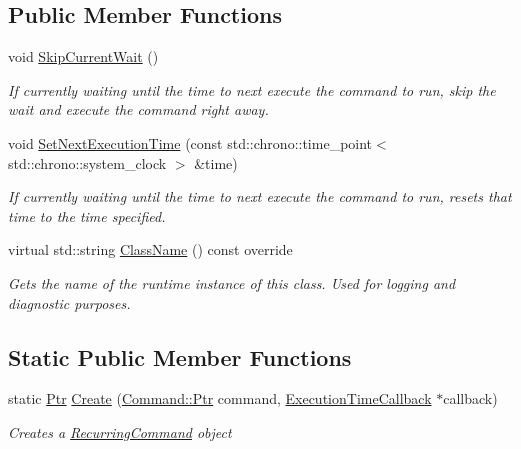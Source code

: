 \subsection*{Public Member Functions}
\begin{DoxyCompactItemize}
\item 
void \mbox{\hyperlink{class_command_lib_1_1_recurring_command_a11e19f7c0cbc93c33e36f6c75d858b0f}{Skip\+Current\+Wait}} ()
\begin{DoxyCompactList}\small\item\em If currently waiting until the time to next execute the command to run, skip the wait and execute the command right away.\end{DoxyCompactList}\item 
void \mbox{\hyperlink{class_command_lib_1_1_recurring_command_a954ee8723b21944ab9aa01df0740b690}{Set\+Next\+Execution\+Time}} (const std\+::chrono\+::time\+\_\+point$<$ std\+::chrono\+::system\+\_\+clock $>$ \&time)
\begin{DoxyCompactList}\small\item\em If currently waiting until the time to next execute the command to run, resets that time to the time specified. \end{DoxyCompactList}\item 
\mbox{\label{class_command_lib_1_1_recurring_command_a4e2073b92185dd5f7b545d774afbb929}} 
virtual std\+::string \mbox{\hyperlink{class_command_lib_1_1_recurring_command_a4e2073b92185dd5f7b545d774afbb929}{Class\+Name}} () const override
\begin{DoxyCompactList}\small\item\em Gets the name of the runtime instance of this class. Used for logging and diagnostic purposes.  \end{DoxyCompactList}\end{DoxyCompactItemize}
\subsection*{Static Public Member Functions}
\begin{DoxyCompactItemize}
\item 
static \mbox{\hyperlink{class_command_lib_1_1_command_a3b3e4f00144373299df5c6bb1acc319d}{Ptr}} \mbox{\hyperlink{class_command_lib_1_1_recurring_command_afac0e064cbce4cea8fe5d734367b7c3a}{Create}} (\mbox{\hyperlink{class_command_lib_1_1_command_a3b3e4f00144373299df5c6bb1acc319d}{Command\+::\+Ptr}} command, \mbox{\hyperlink{class_command_lib_1_1_recurring_command_1_1_execution_time_callback}{Execution\+Time\+Callback}} $\ast$callback)
\begin{DoxyCompactList}\small\item\em Creates a \mbox{\hyperlink{class_command_lib_1_1_recurring_command}{Recurring\+Command}} object \end{DoxyCompactList}\end{DoxyCompactItemize}
